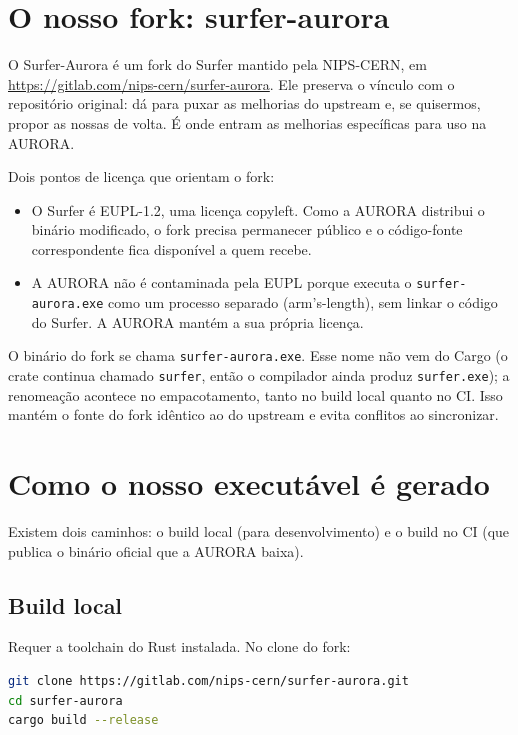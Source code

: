\documentclass[11pt,a4paper]{article}
\begin{document}
\section{O nosso fork: surfer-aurora}

O Surfer-Aurora é um fork do Surfer mantido pela NIPS-CERN, em
\url{https://gitlab.com/nips-cern/surfer-aurora}. Ele preserva o vínculo com o
repositório original: dá para puxar as melhorias do upstream e, se quisermos,
propor as nossas de volta. É onde entram as melhorias específicas para uso na
AURORA.

Dois pontos de licença que orientam o fork:

\begin{itemize}
  \item O Surfer é EUPL-1.2, uma licença copyleft. Como a AURORA distribui o
        binário modificado, o fork precisa permanecer público e o código-fonte
        correspondente fica disponível a quem recebe.
  \item A AURORA não é contaminada pela EUPL porque executa o
        \texttt{surfer-aurora.exe} como um processo separado (arm's-length), sem
        linkar o código do Surfer. A AURORA mantém a sua própria licença.
\end{itemize}

O binário do fork se chama \texttt{surfer-aurora.exe}. Esse nome não vem do
Cargo (o crate continua chamado \texttt{surfer}, então o compilador ainda produz
\texttt{surfer.exe}); a renomeação acontece no empacotamento, tanto no build
local quanto no CI. Isso mantém o fonte do fork idêntico ao do upstream e evita
conflitos ao sincronizar.

\section{Como o nosso executável é gerado}

Existem dois caminhos: o build local (para desenvolvimento) e o build no CI (que
publica o binário oficial que a AURORA baixa).

\subsection{Build local}

Requer a toolchain do Rust instalada. No clone do fork:

\begin{lstlisting}[language=bash]
git clone https://gitlab.com/nips-cern/surfer-aurora.git
cd surfer-aurora
cargo build --release
\end{lstlisting}
\end{document}

